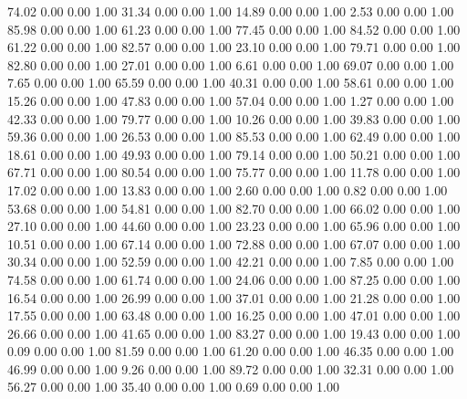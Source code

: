    74.02   0.00   0.00   1.00
   31.34   0.00   0.00   1.00
   14.89   0.00   0.00   1.00
    2.53   0.00   0.00   1.00
   85.98   0.00   0.00   1.00
   61.23   0.00   0.00   1.00
   77.45   0.00   0.00   1.00
   84.52   0.00   0.00   1.00
   61.22   0.00   0.00   1.00
   82.57   0.00   0.00   1.00
   23.10   0.00   0.00   1.00
   79.71   0.00   0.00   1.00
   82.80   0.00   0.00   1.00
   27.01   0.00   0.00   1.00
    6.61   0.00   0.00   1.00
   69.07   0.00   0.00   1.00
    7.65   0.00   0.00   1.00
   65.59   0.00   0.00   1.00
   40.31   0.00   0.00   1.00
   58.61   0.00   0.00   1.00
   15.26   0.00   0.00   1.00
   47.83   0.00   0.00   1.00
   57.04   0.00   0.00   1.00
    1.27   0.00   0.00   1.00
   42.33   0.00   0.00   1.00
   79.77   0.00   0.00   1.00
   10.26   0.00   0.00   1.00
   39.83   0.00   0.00   1.00
   59.36   0.00   0.00   1.00
   26.53   0.00   0.00   1.00
   85.53   0.00   0.00   1.00
   62.49   0.00   0.00   1.00
   18.61   0.00   0.00   1.00
   49.93   0.00   0.00   1.00
   79.14   0.00   0.00   1.00
   50.21   0.00   0.00   1.00
   67.71   0.00   0.00   1.00
   80.54   0.00   0.00   1.00
   75.77   0.00   0.00   1.00
   11.78   0.00   0.00   1.00
   17.02   0.00   0.00   1.00
   13.83   0.00   0.00   1.00
    2.60   0.00   0.00   1.00
    0.82   0.00   0.00   1.00
   53.68   0.00   0.00   1.00
   54.81   0.00   0.00   1.00
   82.70   0.00   0.00   1.00
   66.02   0.00   0.00   1.00
   27.10   0.00   0.00   1.00
   44.60   0.00   0.00   1.00
   23.23   0.00   0.00   1.00
   65.96   0.00   0.00   1.00
   10.51   0.00   0.00   1.00
   67.14   0.00   0.00   1.00
   72.88   0.00   0.00   1.00
   67.07   0.00   0.00   1.00
   30.34   0.00   0.00   1.00
   52.59   0.00   0.00   1.00
   42.21   0.00   0.00   1.00
    7.85   0.00   0.00   1.00
   74.58   0.00   0.00   1.00
   61.74   0.00   0.00   1.00
   24.06   0.00   0.00   1.00
   87.25   0.00   0.00   1.00
   16.54   0.00   0.00   1.00
   26.99   0.00   0.00   1.00
   37.01   0.00   0.00   1.00
   21.28   0.00   0.00   1.00
   17.55   0.00   0.00   1.00
   63.48   0.00   0.00   1.00
   16.25   0.00   0.00   1.00
   47.01   0.00   0.00   1.00
   26.66   0.00   0.00   1.00
   41.65   0.00   0.00   1.00
   83.27   0.00   0.00   1.00
   19.43   0.00   0.00   1.00
    0.09   0.00   0.00   1.00
   81.59   0.00   0.00   1.00
   61.20   0.00   0.00   1.00
   46.35   0.00   0.00   1.00
   46.99   0.00   0.00   1.00
    9.26   0.00   0.00   1.00
   89.72   0.00   0.00   1.00
   32.31   0.00   0.00   1.00
   56.27   0.00   0.00   1.00
   35.40   0.00   0.00   1.00
    0.69   0.00   0.00   1.00
